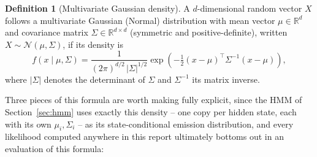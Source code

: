 \documentclass[11pt]{article}
\theoremstyle{definition}
\newtheorem{definition}[theorem]{Definition}
\theoremstyle{remark}
\begin{document}
\begin{definition}[Multivariate Gaussian density]
A $d$-dimensional random vector $X$ follows a multivariate Gaussian (Normal) distribution with mean vector $\mu\in\mathbb{R}^d$ and covariance matrix $\Sigma\in\mathbb{R}^{d\times d}$ (symmetric and positive-definite), written $X\sim\mathcal N(\mu,\Sigma)$, if its density is
\[
f(x\mid\mu,\Sigma) = \frac{1}{(2\pi)^{d/2}\,|\Sigma|^{1/2}}\exp\!\left(-\tfrac12(x-\mu)^\top\Sigma^{-1}(x-\mu)\right),
\]
where $|\Sigma|$ denotes the determinant of $\Sigma$ and $\Sigma^{-1}$ its matrix inverse.
\end{definition}
Three pieces of this formula are worth making fully explicit, since the HMM of Section~\ref{sec:hmm} uses exactly this density -- one copy per hidden state, each with its own $\mu_i,\Sigma_i$ -- as its state-conditional emission distribution, and every likelihood computed anywhere in this report ultimately bottoms out in an evaluation of this formula:
\end{document}
